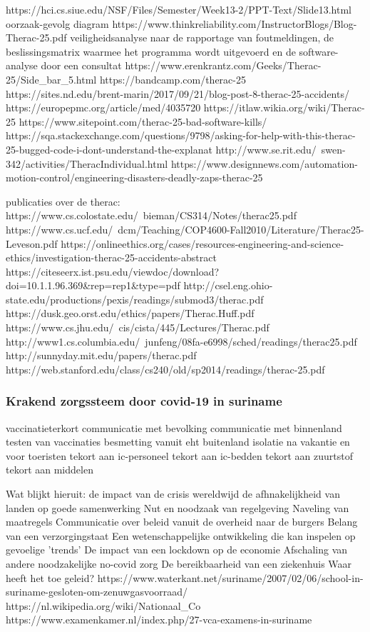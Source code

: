 https://hci.cs.siue.edu/NSF/Files/Semester/Week13-2/PPT-Text/Slide13.html
oorzaak-gevolg diagram
https://www.thinkreliability.com/InstructorBlogs/Blog-Therac-25.pdf
veiligheidsanalyse naar de rapportage van foutmeldingen, de beslissingsmatrix waarmee het programma wordt uitgevoerd en de software-analyse door een consultat
https://www.erenkrantz.com/Geeks/Therac-25/Side_bar_5.html
https://bandcamp.com/therac-25
https://sites.nd.edu/brent-marin/2017/09/21/blog-post-8-therac-25-accidents/
https://europepmc.org/article/med/4035720
https://itlaw.wikia.org/wiki/Therac-25
https://www.sitepoint.com/therac-25-bad-software-kills/
https://sqa.stackexchange.com/questions/9798/asking-for-help-with-this-therac-25-bugged-code-i-dont-understand-the-explanat
http://www.se.rit.edu/~swen-342/activities/TheracIndividual.html
https://www.designnews.com/automation-motion-control/engineering-disasters-deadly-zaps-therac-25

publicaties over de therac:
https://www.cs.colostate.edu/~bieman/CS314/Notes/therac25.pdf
https://www.cs.ucf.edu/~dcm/Teaching/COP4600-Fall2010/Literature/Therac25-Leveson.pdf
https://onlineethics.org/cases/resources-engineering-and-science-ethics/investigation-therac-25-accidents-abstract
https://citeseerx.ist.psu.edu/viewdoc/download?doi=10.1.1.96.369&rep=rep1&type=pdf
http://csel.eng.ohio-state.edu/productions/pexis/readings/submod3/therac.pdf
https://dusk.geo.orst.edu/ethics/papers/Therac.Huff.pdf
https://www.cs.jhu.edu/~cis/cista/445/Lectures/Therac.pdf
http://www1.cs.columbia.edu/~junfeng/08fa-e6998/sched/readings/therac25.pdf
http://sunnyday.mit.edu/papers/therac.pdf
https://web.stanford.edu/class/cs240/old/sp2014/readings/therac-25.pdf





\subsubsection{Krakend zorgssteem door covid-19 in suriname}

vaccinatieterkort
communicatie met bevolking
communicatie met binnenland
testen van vaccinaties
besmetting vanuit eht buitenland
isolatie na vakantie en voor toeristen
tekort aan ic-personeel
tekort aan ic-bedden
tekort aan zuurtstof
tekort aan middelen

Wat blijkt hieruit:
de impact van de crisis wereldwijd
de afhnakelijkheid van landen op goede samenwerking
Nut en noodzaak van regelgeving
Naveling van maatregels
Communicatie over beleid vanuit de overheid naar de burgers
Belang van een verzorgingstaat
Een wetenschappelijke ontwikkeling die kan inspelen op gevoelige 'trends'
De impact van een lockdown op de economie
Afschaling van andere noodzakelijke no-covid zorg
De bereikbaarheid van een ziekenhuis
Waar heeft het toe geleid?
https://www.waterkant.net/suriname/2007/02/06/school-in-suriname-gesloten-om-zenuwgasvoorraad/
https://nl.wikipedia.org/wiki/Nationaal_Co%
https://www.examenkamer.nl/index.php/27-vca-examens-in-suriname



